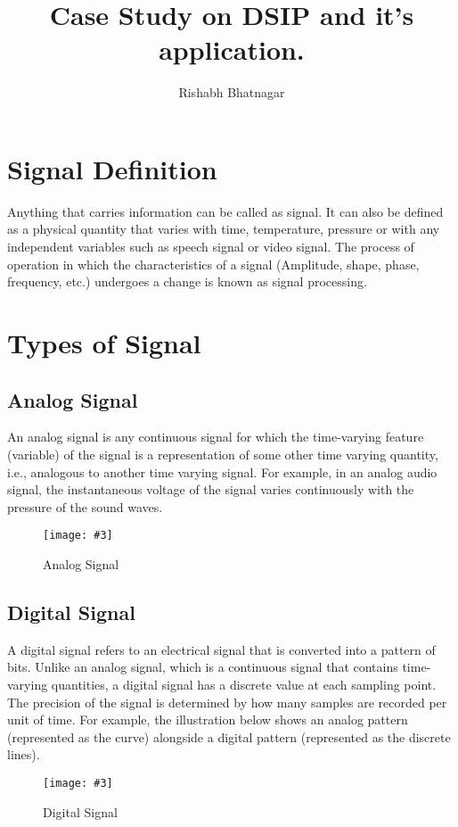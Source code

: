 \documentclass{article}
\newcommand{\addImage}[5]{
    \begin{figure}[#1]
        \centering
        \texttt{[image: \#3]}
        \caption{#4}
        \label{fig:#5}
    \end{figure}
}
\begin{document}
   \title{Case Study on DSIP and it's application.}                           
    \author{Rishabh Bhatnagar}
    \maketitle
    \tableofcontents
    \newpage

    \begin{multicols}{2}                %

    \section{Signal Definition}
        Anything that carries information can be called as signal. 
        It can also be defined as a physical quantity that varies with time, 
        temperature, pressure or with any independent variables such as 
        speech signal or video signal. The process of operation in which the 
        characteristics of a signal (Amplitude, shape, phase, frequency, etc.) 
        undergoes a change is known as signal processing. 
        \cite{tpSignal}

    \section{Types of Signal}
        \subsection{Analog Signal}
            An analog signal is any continuous signal for which the 
            time-varying feature (variable) of the signal is a representation 
            of some other time varying quantity, i.e., analogous to another 
            time varying signal. For example, in an analog audio signal, the 
            instantaneous voltage of the signal varies continuously with the 
            pressure of the sound waves.
            \cite{wikiAnalog}
        \addImage{H}{6cm}{analogSignal.jpeg}{Analog Signal}{analog signal}
        \subsection{Digital Signal}
            A digital signal refers to an electrical signal that is converted 
            into a pattern of bits. Unlike an analog signal, which is a 
            continuous signal that contains time-varying quantities, a digital 
            signal has a discrete value at each sampling point. The precision 
            of the signal is determined by how many samples are recorded per 
            unit of time. For example, the illustration below shows an analog 
            pattern (represented as the curve) alongside a digital pattern 
            (represented as the discrete lines). 
            \cite{digitalSignalDefn}
        \addImage{H}{8cm}{digitalSignal.png}{Digital Signal \cite{digitalSignalImage}}{digital signal}

\end{multicols}
\end{document}
